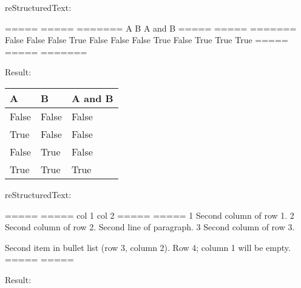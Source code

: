 \documentclass[letterpaper,11pt,english]{sphinxmanual}
\begin{document}
reStructuredText:

\begin{sphinxVerbatim}[commandchars=\\\{\}]
=====  =====  =======
  A      B    A and B
=====  =====  =======
False  False  False
True   False  False
False  True   False
True   True   True
=====  =====  =======
\end{sphinxVerbatim}

Result:


\begin{savenotes}\sphinxattablestart
\centering
\begin{tabulary}{\linewidth}[t]{|T|T|T|}
\hline
\sphinxstyletheadfamily 
A
&\sphinxstyletheadfamily 
B
&\sphinxstyletheadfamily 
A and B
\\
\hline
False
&
False
&
False
\\
\hline
True
&
False
&
False
\\
\hline
False
&
True
&
False
\\
\hline
True
&
True
&
True
\\
\hline
\end{tabulary}
\par
\sphinxattableend\end{savenotes}

reStructuredText:

\begin{sphinxVerbatim}[commandchars=\\\{\}]
=====  =====
col 1  col 2
=====  =====
1      Second column of row 1.
2      Second column of row 2.
       Second line of paragraph.
3      \PYGZhy{} Second column of row 3.

        Second item in bullet
         list (row 3, column 2).
\PYGZbs{}      Row 4; column 1 will be empty.
=====  =====
\end{sphinxVerbatim}

Result:
\end{document}
